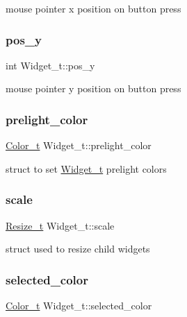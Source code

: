mouse pointer x position on button press \mbox{\label{structWidget__t_a9b127ac6b3f017b367351ee673e063c3}} 
\subsubsection{\texorpdfstring{pos\+\_\+y}{pos\_y}}
{\footnotesize\ttfamily int Widget\+\_\+t\+::pos\+\_\+y}

mouse pointer y position on button press \mbox{\label{structWidget__t_a58cb10635bfd905d2d361b492b7c6565}} 
\subsubsection{\texorpdfstring{prelight\+\_\+color}{prelight\_color}}
{\footnotesize\ttfamily \hyperlink{structColor__t}{Color\+\_\+t} Widget\+\_\+t\+::prelight\+\_\+color}

struct to set \hyperlink{structWidget__t}{Widget\+\_\+t} prelight colors \mbox{\label{structWidget__t_a9a2d5b53f40f5bf3914fc0694027d7ec}} 
\subsubsection{\texorpdfstring{scale}{scale}}
{\footnotesize\ttfamily \hyperlink{structResize__t}{Resize\+\_\+t} Widget\+\_\+t\+::scale}

struct used to resize child widgets \mbox{\label{structWidget__t_ae473f4da8e3178696dc7261ca2147179}} 
\subsubsection{\texorpdfstring{selected\+\_\+color}{selected\_color}}
{\footnotesize\ttfamily \hyperlink{structColor__t}{Color\+\_\+t} Widget\+\_\+t\+::selected\+\_\+color}

